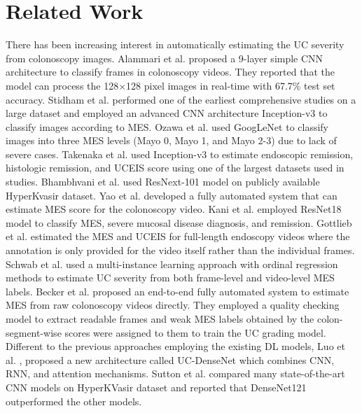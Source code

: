 \documentclass[runningheads]{llncs}
\begin{document}
\section{Related Work}

There has been increasing interest in automatically estimating the UC severity from colonoscopy images. Alammari et al. \cite{alammari2017classification} proposed a 9-layer simple CNN architecture to classify frames in colonoscopy videos. They reported that the model can process the 128$\times$128 pixel images in real-time with 67.7\% test set accuracy. Stidham et al. \cite{stidham2019performance} performed one of the earliest comprehensive studies on a large dataset and employed an advanced CNN architecture Inception-v3 \cite{szegedy2016rethinking} to classify images according to MES. Ozawa et al. \cite{ozawa2019novel} used GoogLeNet \cite{szegedy2015going} to classify images into three MES levels (Mayo 0, Mayo 1, and Mayo 2-3) due to lack of severe cases. Takenaka et al. \cite{takenaka2020development} used Inception-v3 \cite{szegedy2016rethinking} to estimate endoscopic remission, histologic remission, and UCEIS score using one of the largest datasets used in studies. Bhambhvani et al. \cite{bhambhvani2021deep} used ResNext-101 model on publicly available HyperKvasir dataset. Yao et al. \cite{yao2021fully} developed a fully automated system that can estimate MES score for the colonoscopy video. Kani et al. \cite{kani2021p099} employed ResNet18 model to classify MES, severe mucosal disease diagnosis, and remission. Gottlieb et al. \cite{gottlieb2021central} estimated the MES and UCEIS for full-length endoscopy videos where the annotation is only provided for the video itself rather than the individual frames. Schwab et al. \cite{schwab2021automatic} used a multi-instance learning approach with ordinal regression methods to estimate UC severity from both frame-level and video-level MES labels. Becker et al. \cite{gutierrez2021training} proposed an end-to-end fully automated system to estimate MES from raw colonoscopy videos directly. They employed a quality checking model to extract readable frames and weak MES labels obtained by the colon-segment-wise scores were assigned to them to train the UC grading model. Different to the previous approaches employing the existing DL models, Luo et al. \cite{luo2022diagnosis}, proposed a new architecture called UC-DenseNet which combines CNN, RNN, and attention mechanisms. Sutton et al. \cite{sutton2022artificial} compared many state-of-the-art CNN models on HyperKVasir \cite{borgli2020hyperkvasir} dataset and reported that DenseNet121 \cite{huang2017densely} outperformed the other models.
\end{document}
